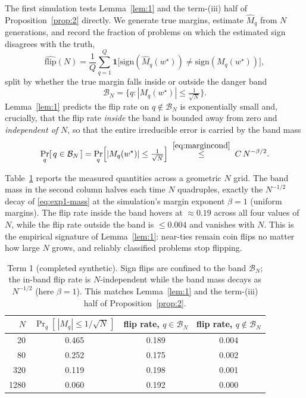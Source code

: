 \documentclass{article} %
\providecommand{\Mhat}{\widehat{M}}
\providecommand{\wstar}{w^{\star}}
\providecommand{\sign}{\mathrm{sign}}
\begin{document}
The first simulation tests Lemma~\ref{lem:1} and the term-(iii) half of
Proposition~\ref{prop:2} directly. We generate true margins, estimate $\Mhat_q$
from $N$ generations, and record the fraction of problems on which the estimated
sign disagrees with the truth,
\begin{equation}
\label{eq:exp1-flip}
\widehat{\mathrm{flip}}(N)
= \frac1{Q}\sum_{q=1}^{Q}
\mathbf 1\!\big[\sign(\Mhat_q(\wstar)) \ne \sign(M_q(\wstar))\big],
\end{equation}
split by whether the true margin falls inside or outside the danger band
\begin{equation}
\label{eq:exp1-band}
\mathcal B_N = \Big\{ q : |M_q(\wstar)| \le \tfrac{1}{\sqrt N} \Big\}.
\end{equation}
Lemma~\ref{lem:1} predicts the flip rate on $q\notin\mathcal B_N$ is exponentially
small and, crucially, that the flip rate \emph{inside} the band is bounded away
from zero and \emph{independent of $N$}, so that the entire irreducible error is
carried by the band mass
\begin{equation}
\label{eq:exp1-mass}
\Pr_q[\,q\in\mathcal B_N\,]
= \Pr_q\!\Big[|M_q(\wstar)|\le \tfrac1{\sqrt N}\Big]
\;\overset{\eqref{eq:margincond}}{\le}\;
C\,N^{-\beta/2}.
\end{equation}

Table~\ref{tab:channel1} reports the measured quantities across a geometric $N$
grid. The band mass in the second column halves each time $N$ quadruples, exactly
the $N^{-1/2}$ decay of \eqref{eq:exp1-mass} at the simulation's margin exponent
$\beta=1$ (uniform margins). The flip rate inside the band hovers at
$\approx 0.19$ across all four values of $N$, while the flip rate outside the band
is $\le 0.004$ and vanishes with $N$. This is the empirical signature of
Lemma~\ref{lem:1}: near-ties remain coin flips no matter how large $N$ grows, and
reliably classified problems stop flipping.

\begin{table}[t]
\centering
\small
\begin{tabular}{rccc}
\toprule
$N$ & $\Pr_q[\,|M_q|\le 1/\sqrt N\,]$ & flip rate, $q\in\mathcal B_N$ & flip rate, $q\notin\mathcal B_N$ \\
\midrule
20   & 0.465 & 0.189 & 0.004 \\
80   & 0.252 & 0.175 & 0.002 \\
320  & 0.119 & 0.198 & 0.001 \\
1280 & 0.060 & 0.192 & 0.000 \\
\bottomrule
\end{tabular}
\caption{Term 1 (completed synthetic). Sign flips are confined to the band
$\mathcal B_N$; the in-band flip rate is $N$-independent while the band mass decays
as $N^{-1/2}$ (here $\beta=1$). This matches Lemma~\ref{lem:1} and the term-(iii)
half of Proposition~\ref{prop:2}.}
\label{tab:channel1}
\end{table}
\end{document}
